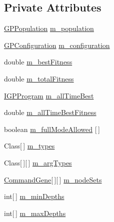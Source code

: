 \subsection*{Private Attributes}
\begin{DoxyCompactItemize}
\item 
\hyperlink{classorg_1_1jgap_1_1gp_1_1impl_1_1_g_p_population}{G\-P\-Population} \hyperlink{classorg_1_1jgap_1_1gp_1_1impl_1_1_g_p_genotype_a32bf2d50f238455154d3466fc1ef09a1}{m\-\_\-population}
\item 
\hyperlink{classorg_1_1jgap_1_1gp_1_1impl_1_1_g_p_configuration}{G\-P\-Configuration} \hyperlink{classorg_1_1jgap_1_1gp_1_1impl_1_1_g_p_genotype_a2156c601b24d1a7fdcad1c59ec05e147}{m\-\_\-configuration}
\item 
double \hyperlink{classorg_1_1jgap_1_1gp_1_1impl_1_1_g_p_genotype_a957b0de7013e1055b66e03223dc890f2}{m\-\_\-best\-Fitness}
\item 
double \hyperlink{classorg_1_1jgap_1_1gp_1_1impl_1_1_g_p_genotype_a590812317593272cd66908ef7b712a63}{m\-\_\-total\-Fitness}
\item 
\hyperlink{interfaceorg_1_1jgap_1_1gp_1_1_i_g_p_program}{I\-G\-P\-Program} \hyperlink{classorg_1_1jgap_1_1gp_1_1impl_1_1_g_p_genotype_a6bd9f97a0bb39ec138f6d8ca8ebd25e5}{m\-\_\-all\-Time\-Best}
\item 
double \hyperlink{classorg_1_1jgap_1_1gp_1_1impl_1_1_g_p_genotype_a869b5d4ab431717009978a9d870bf5d8}{m\-\_\-all\-Time\-Best\-Fitness}
\item 
boolean \hyperlink{classorg_1_1jgap_1_1gp_1_1impl_1_1_g_p_genotype_a3bfbce17cabd5ef77caf8427f5511407}{m\-\_\-full\-Mode\-Allowed} \mbox{[}$\,$\mbox{]}
\item 
Class\mbox{[}$\,$\mbox{]} \hyperlink{classorg_1_1jgap_1_1gp_1_1impl_1_1_g_p_genotype_ae23e8520ee01ca7cb8f927a262db49c6}{m\-\_\-types}
\item 
Class\mbox{[}$\,$\mbox{]}\mbox{[}$\,$\mbox{]} \hyperlink{classorg_1_1jgap_1_1gp_1_1impl_1_1_g_p_genotype_a8e26c3d41a0e1922310e9d966f80238f}{m\-\_\-arg\-Types}
\item 
\hyperlink{classorg_1_1jgap_1_1gp_1_1_command_gene}{Command\-Gene}\mbox{[}$\,$\mbox{]}\mbox{[}$\,$\mbox{]} \hyperlink{classorg_1_1jgap_1_1gp_1_1impl_1_1_g_p_genotype_a045ec05f97be18ddbd121eb709d3e450}{m\-\_\-node\-Sets}
\item 
int\mbox{[}$\,$\mbox{]} \hyperlink{classorg_1_1jgap_1_1gp_1_1impl_1_1_g_p_genotype_af87aee9616f225ec99bf2f3db601e492}{m\-\_\-min\-Depths}
\item 
int\mbox{[}$\,$\mbox{]} \hyperlink{classorg_1_1jgap_1_1gp_1_1impl_1_1_g_p_genotype_a7e95fd6aefeefa158ca044abccc0ffa9}{m\-\_\-max\-Depths}

\end{DoxyCompactItemize}

